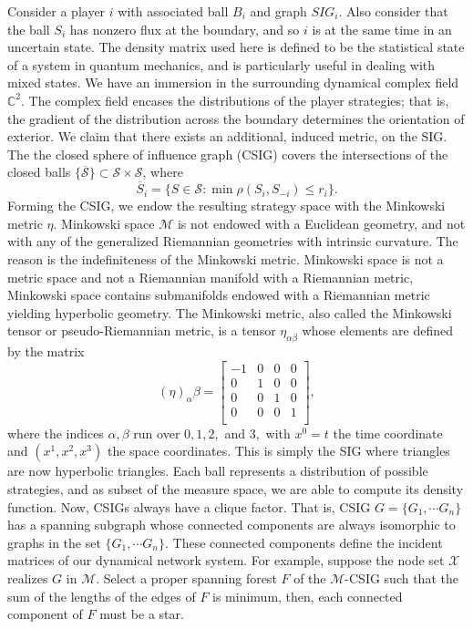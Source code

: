 \documentclass[10pt]{article}
\newcommand{\mcM}{\mathcal{M}}
\newcommand{\mcX}{\mathcal{X}}
\newcommand{\mcS}{\mathcal{S}}
\theoremstyle{definition}
\begin{document}
Consider a player $i$ with associated ball $B_i$ and graph $SIG_i$. Also consider that the ball $S_i$ has nonzero flux
at the boundary, and so $i$ is at the same time in an uncertain state. The
density matrix used here is defined to be the statistical state of a system in
quantum mechanics, and is particularly useful in dealing with mixed states.
We have an immersion in the surrounding
dynamical complex field $\mathbb{C}^2$. The complex field encases the distributions of the
player strategies; that is, the gradient of the distribution across the boundary
determines the orientation of exterior.
We claim that there exists an additional, induced metric, on the
SIG. The the closed sphere of influence graph (CSIG) covers the intersections
of the closed balls $\lbrace\overline{\mcS}\rbrace \subset \mcS\times \mcS$, where
$$
    \overline{S}_i= \lbrace S \in \mcS : \min\rho(S_i, S_{-i}) \le r_i\rbrace.
$$
Forming the CSIG,
we endow the resulting strategy space with the Minkowski metric $\eta$.
Minkowski space $\mcM$ is not endowed with a Euclidean geometry, and not with any of the generalized Riemannian geometries with intrinsic curvature. The reason is the indefiniteness of the Minkowski metric. Minkowski space is not a metric space and not a Riemannian manifold with a Riemannian metric, Minkowski space contains submanifolds endowed with a Riemannian metric yielding hyperbolic geometry. The Minkowski metric, also called the Minkowski tensor or pseudo-Riemannian metric, is a tensor $\eta_{\alpha\beta}$ whose elements are defined by the matrix
$$
	(\eta)_\alpha\beta = \begin{bmatrix}
		-1 & 0 & 0 & 0 \\
		0 & 1 & 0 & 0 \\
		0 & 0 & 1 & 0 \\
		0 & 0 & 0 & 1 \\
	\end{bmatrix},
$$
where the indices $\alpha,\beta$ run over $0, 1, 2,$ and $3,$ with $x^0=t$ the time coordinate and $(x^1,x^2,x^3)$ the space coordinates. This is simply the SIG where triangles are now hyperbolic triangles. 
Each ball represents a distribution of possible strategies, and as subset of the
measure space, we are able to compute its density function. 
Now, CSIGs always have a clique factor. That is, CSIG $G = \lbrace G_1,\cdots G_n\rbrace$ has a spanning subgraph whose connected components are always isomorphic to graphs in the set $\lbrace G_1,\cdots G_n\rbrace$. These connected components define the incident matrices of our dynamical network system. For example, suppose the node set $\mcX$ realizes $G$ in $\mcM$. Select a proper spanning forest $F$
of the $\mcM$-CSIG such that the sum of the lengths of the edges of $F$ is minimum, then, each connected component of $F$ must be a star.
\end{document}
